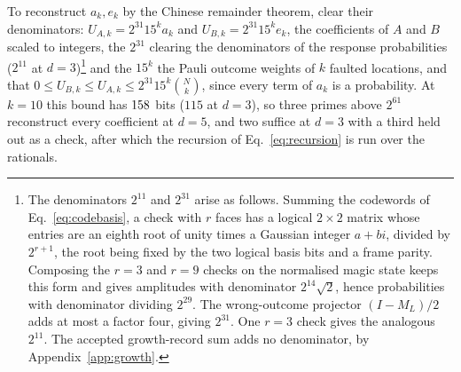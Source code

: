 To reconstruct $a_k,e_k$ by the Chinese remainder theorem, clear their denominators: $U_{A,k}=2^{31}15^ka_k$ and $U_{B,k}=2^{31}15^ke_k$, the coefficients of $A$ and $B$ scaled to integers, the $2^{31}$ clearing the denominators of the response probabilities ($2^{11}$ at $d=3$)\footnote{The denominators $2^{11}$ and $2^{31}$ arise as follows. Summing the codewords of Eq.~\eqref{eq:codebasis}, a check with $r$ faces has a logical $2\times2$ matrix whose entries are an eighth root of unity times a Gaussian integer $a+bi$, divided by $2^{r+1}$, the root being fixed by the two logical basis bits and a frame parity. Composing the $r=3$ and $r=9$ checks on the normalised magic state keeps this form and gives amplitudes with denominator $2^{14}\sqrt2$, hence probabilities with denominator dividing $2^{29}$. The wrong-outcome projector $(I-M_L)/2$ adds at most a factor four, giving $2^{31}$. One $r=3$ check gives the analogous $2^{11}$. The accepted growth-record sum adds no denominator, by Appendix~\ref{app:growth}.} and the $15^k$ the Pauli outcome weights of $k$ faulted locations, and that $0\le U_{B,k}\le U_{A,k}\le2^{31}15^k\binom Nk$, since every term of $a_k$ is a probability. At $k=10$ this bound has $158$ bits ($115$ at $d=3$), so three primes above $2^{61}$ reconstruct every coefficient at $d=5$, and two suffice at $d=3$ with a third held out as a check, after which the recursion of Eq.~\eqref{eq:recursion} is run over the rationals.


